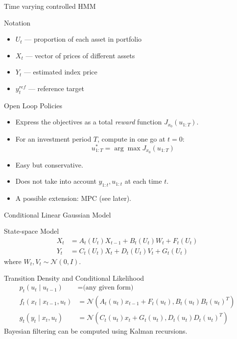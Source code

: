\documentclass[handout]{beamer}
\begin{document}
\begin{frame}{Time varying controlled HMM}
\begin{block}{Notation}
\begin{itemize}
\item $U_t$  --- proportion of each asset in portfolio
\item $X_t$ --- vector of prices of different assets
\item $Y_t$ --- estimated index price
\item $y^{ref}_t$ --- reference target
\end{itemize}
\end{block}
\begin{block}{Open Loop Policies}
\begin{itemize}
\item Express the objectives as a total \emph{reward} function $J_{x_0}(u_{1:T})$.
\item For an investment period $T$,  compute in one go at $t=0$:
 \small \begin{equation*}
      u^*_{1:T} = \arg\max J_{x_0}(u_{1:T})
   \end{equation*}\normalsize
\item Easy but conservative.
\item Does not take into account $y_{1:t}, u_{1:t}$ at each time $t$.
\item A possible extension: MPC (see later).
\end{itemize}
\end{block}
\end{frame}

\begin{frame}{Conditional Linear Gaussian Model}
\begin{block}{State-space Model}
\begin{align*}
  X_t &= A_t(U_t)X_{t-1} + B_t(U_t)W_t + F_t(U_t) \nonumber \\
  Y_t &= C_t(U_t)X_t + D_t(U_t)V_t + G_t(U_t)
\label{eq:model}
\end{align*}
where $W_t, V_t \sim \mathcal{N}(0,I)$.
\end{block}
\begin{block}{Transition Density and Conditional Likelihood}
\begin{align*}  p_t(u_t \mid u_{t-1}) &= \textrm{(any given form)} \nonumber \\
  f_t(x_t \mid x_{t-1}, u_t) &= \mathcal{N}(A_t(u_t) x_{t-1} + F_t(u_t), B_t(u_t)B_t(u_t)^T) \nonumber \\
  g_t(y_t \mid x_t, u_t)    &= \mathcal{N}(C_t(u_t) x_t + G_t(u_t), D_t(u_t)D_t(u_t)^T)
\end{align*}
Bayesian filtering can be computed using Kalman recursions.
\end{block}
\end{frame}
\end{document}
